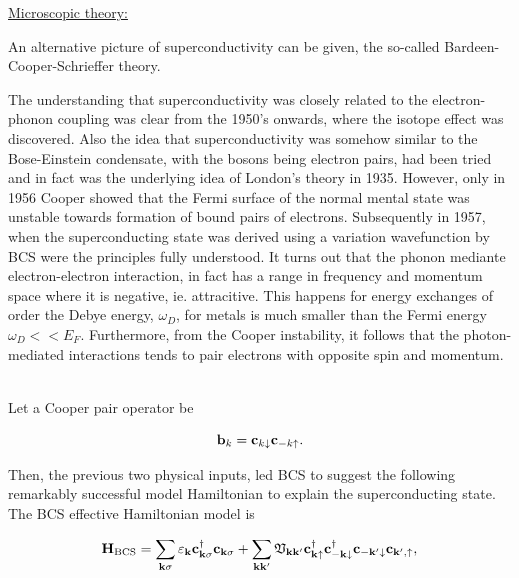 \clearpage

\underline{Microscopic theory:} 

An alternative picture of superconductivity can be given, the so-called Bardeen-Cooper-Schrieffer theory.

\begin{tcolorbox}[colback = LimeGreen, title = Historical Context:]

The understanding that superconductivity was closely related to the electron-phonon coupling was clear from the 1950's onwards, where the isotope effect was discovered. Also the idea that superconductivity was somehow similar to the Bose-Einstein condensate, with the bosons being electron pairs, had been tried and in fact was the underlying idea of London's theory in 1935. However, only in 1956 Cooper showed that the Fermi surface of the normal mental state was unstable towards formation of bound pairs of electrons. Subsequently in 1957, when the superconducting state was derived using a variation wavefunction by BCS were the principles fully understood. It turns out that the phonon mediante electron-electron interaction, in fact has a range in frequency and momentum space where it is negative, ie. attracitive. This happens for energy exchanges of order the Debye energy, $\omega_D$, for metals is much smaller than the Fermi energy $\omega_D << E_F$. Furthermore, from the Cooper instability, it follows that the photon-mediated interactions tends to pair electrons with opposite spin and momentum.

\end{tcolorbox}

\blanky \\

Let a Cooper pair operator be

\begin{equation}
    {\bf b}_k = {\bf c}_{k \downarrow} {\bf c}_{-k \uparrow}.
\end{equation}

Then, the previous two physical inputs, led BCS to suggest the following remarkably successful model Hamiltonian to explain the superconducting state. The BCS effective Hamiltonian model is 

\begin{equation}
    {\bf H}_{\textnormal{BCS}} = \sum_{{\bf k} \sigma} \varepsilon_{{\bf k}} {\bf c}_{{\bf k} \sigma}^\dagger {\bf c}_{{\bf k} \sigma} + \sum_{{\bf k} {\bf k}'} {\mathfrak{V}}_{{\bf k}{\bf k}'} {\bf c}_{{\bf k} \uparrow}^\dagger {\bf c}_{-{\bf k} \downarrow}^\dagger {\bf c}_{-{\bf k}' \downarrow} {\bf c}_{{\bf k}', \uparrow}, 
\end{equation}

